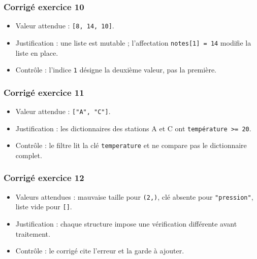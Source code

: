 \subsubsection{Corrigé exercice 10}

\begin{itemize}
\tightlist
\item
  Valeur attendue : \texttt{{[}8,\ 14,\ 10{]}}.
\item
  Justification : une liste est mutable ; l'affectation
  \texttt{notes{[}1{]}\ =\ 14} modifie la liste en place.
\item
  Contrôle : l'indice \texttt{1} désigne la deuxième valeur, pas la
  première.
\end{itemize}

\subsubsection{Corrigé exercice 11}

\begin{itemize}
\tightlist
\item
  Valeur attendue : \texttt{{[}"A",\ "C"{]}}.
\item
  Justification : les dictionnaires des stations A et C ont
  \texttt{température\ \textgreater{}=\ 20}.
\item
  Contrôle : le filtre lit la clé \texttt{temperature} et ne compare pas
  le dictionnaire complet.
\end{itemize}

\subsubsection{Corrigé exercice 12}

\begin{itemize}
\tightlist
\item
  Valeurs attendues : mauvaise taille pour \texttt{(2,)}, clé absente
  pour \texttt{"pression"}, liste vide pour \texttt{{[}{]}}.
\item
  Justification : chaque structure impose une vérification différente
  avant traitement.
\item
  Contrôle : le corrigé cite l'erreur et la garde à ajouter.
\end{itemize}
